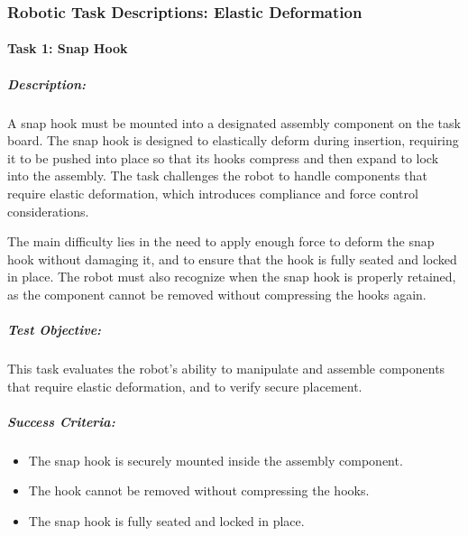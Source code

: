 \documentclass[letterpaper,10pt,english]{sphinxmanual}
\begin{document}
\sphinxstepscope


\subsubsection{Robotic Task Descriptions: Elastic Deformation}
\label{\detokenize{robotic_instructions_elastic_deformation:robotic-task-descriptions-elastic-deformation}}\label{\detokenize{robotic_instructions_elastic_deformation::doc}}

\paragraph{Task 1: Snap Hook}
\label{\detokenize{robotic_instructions_elastic_deformation:task-1-snap-hook}}

\subparagraph{Description:}
\label{\detokenize{robotic_instructions_elastic_deformation:description}}
\sphinxAtStartPar
A snap hook must be mounted into a designated assembly component on the task board.
The snap hook is designed to elastically deform during insertion,
requiring it to be pushed into place so that its hooks compress and then expand to lock into the assembly.
The task challenges the robot to handle components that require elastic deformation, which introduces compliance and force control considerations.

\sphinxAtStartPar
The main difficulty lies in the need to apply enough force to deform the snap hook without damaging it,
and to ensure that the hook is fully seated and locked in place. The robot must also recognize when the snap hook is properly retained,
as the component cannot be removed without compressing the hooks again.


\subparagraph{Test Objective:}
\label{\detokenize{robotic_instructions_elastic_deformation:test-objective}}
\sphinxAtStartPar
This task evaluates the robot’s ability to manipulate and assemble components that require elastic deformation, and to verify secure placement.


\subparagraph{Success Criteria:}
\label{\detokenize{robotic_instructions_elastic_deformation:success-criteria}}\begin{itemize}
\item {} 
\sphinxAtStartPar
The snap hook is securely mounted inside the assembly component.

\item {} 
\sphinxAtStartPar
The hook cannot be removed without compressing the hooks.

\item {} 
\sphinxAtStartPar
The snap hook is fully seated and locked in place.

\end{itemize}
\end{document}
